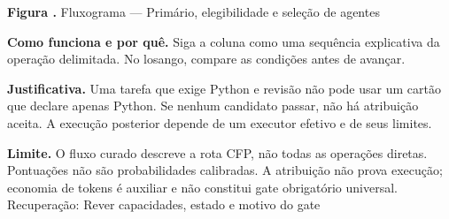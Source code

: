 {\small\textbf{Figura \thefigure.} Fluxograma --- Primário, elegibilidade e seleção de agentes}\par\smallskip
\noindent\textbf{Como funciona e por quê.} Siga a coluna como uma sequência explicativa da operação delimitada. No losango, compare as condições antes de avançar.\par
\noindent\textbf{Justificativa.} Uma tarefa que exige Python e revisão não pode usar um cartão que declare apenas Python. Se nenhum candidato passar, não há atribuição aceita. A execução posterior depende de um executor efetivo e de seus limites.\par
\noindent\textbf{Limite.} O fluxo curado descreve a rota CFP, não todas as operações diretas. Pontuações não são probabilidades calibradas. A atribuição não prova execução; economia de tokens é auxiliar e não constitui gate obrigatório universal. Recuperação: Rever capacidades, estado e motivo do gate\par\smallskip
{}
